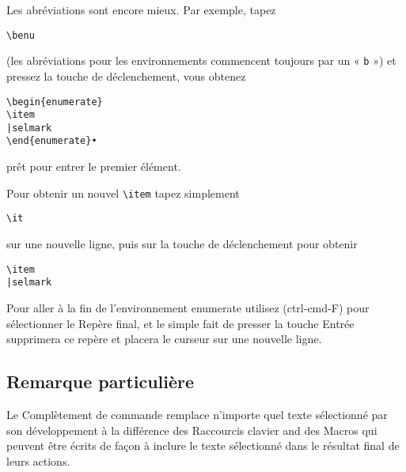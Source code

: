 \documentclass[11pt,french]{article}
\newcommand{\cmd}[1]{\textsf{#1}}
\begin{document}
Les abréviations sont encore mieux. Par exemple, tapez
\begin{verbatim}
\benu
\end{verbatim}
(les abréviations pour les environnements commencent toujours par un « \texttt{b} ») et pressez la touche de déclenchement, vous obtenez
\begin{verbatim}
\begin{enumerate}
\item
|selmark
\end{enumerate}•
\end{verbatim}
prêt pour entrer le premier élément. 
\newpage

Pour obtenir un nouvel \verb+\item+ tapez simplement
\begin{verbatim}
\it
\end{verbatim}
sur une nouvelle ligne, puis sur la touche de déclenchement pour obtenir
\begin{verbatim}
\item
|selmark
\end{verbatim}

Pour aller à la fin de l'environnement enumerate utilisez (\cmd{ctrl-cmd-F}) pour sélectionner le \cmd{Repère} final, et le simple fait de presser la touche \cmd{Entrée} supprimera ce repère et placera le curseur sur une nouvelle ligne.

\subsection{Remarque particulière}


Le \cmd{Complètement de commande} remplace n'importe quel texte sélectionné par son développement à la différence des \cmd{Raccourcis clavier} and des \cmd{Macros} qui peuvent être écrits de façon à inclure le texte sélectionné dans le résultat final de leurs actions.
\end{document}
